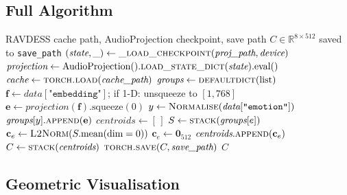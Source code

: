 \documentclass[12pt,a4paper]{article}
\theoremstyle{definition}
\theoremstyle{remark}
\begin{document}
\subsection{Full Algorithm}

\begin{algorithm}[H]
\caption{\texttt{build\_emotion\_centroids}(cache\_path, proj\_path, save\_path)}
\label{alg:centroids}
\begin{algorithmic}[1]
\Require RAVDESS cache path, AudioProjection checkpoint, save path
\Ensure $C \in \mathbb{R}^{8 \times 512}$ saved to \texttt{save\_path}
\State $(\textit{state}, \_) \gets \textsc{\_load\_checkpoint}(\textit{proj\_path}, \textit{device})$
\State $\textit{projection} \gets \text{AudioProjection}().\textsc{load\_state\_dict}(\textit{state}).\text{eval}()$
\State $\textit{cache} \gets \textsc{torch.load}(\textit{cache\_path})$
\State $\textit{groups} \gets \textsc{defaultdict}(\text{list})$
  \State $\mathbf{f} \gets \textit{data}[\texttt{"embedding"}]$; if 1-D: unsqueeze to $[1,768]$
  \State $\mathbf{e} \gets \textit{projection}(\mathbf{f}).\text{squeeze}(0)$
  \State $y \gets \textsc{Normalise}(\textit{data}[\texttt{"emotion"}])$
  \State $\textit{groups}[y].\textsc{append}(\mathbf{e})$
\EndFor
\State $\textit{centroids} \gets [\,]$
    \State $S \gets \textsc{stack}(\textit{groups}[e])$
           \Comment{$[|\mathcal{E}_e|, 512]$}
    \State $\mathbf{c}_e \gets \textsc{L2Norm}(S.\text{mean}(\text{dim}=0))$
  \Else
    \State $\mathbf{c}_e \gets \mathbf{0}_{512}$
  \EndIf
  \State $\textit{centroids}.\textsc{append}(\mathbf{c}_e)$
\EndFor
\State $C \gets \textsc{stack}(\textit{centroids})$
       \Comment{$[8, 512]$}
\State $\textsc{torch.save}(C, \textit{save\_path})$
\State \Return $C$
\end{algorithmic}
\end{algorithm}

\subsection{Geometric Visualisation}
\end{document}
